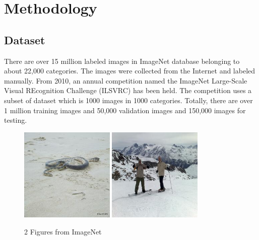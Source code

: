 
\chapter{Methodology} %
\label{Chapter3}

\section{Dataset}

There are over 15 million labeled images in ImageNet database belonging to about 22,000 categories. The images were collected from the Internet and labeled manually. From 2010, an annual competition named the ImageNet Large-Scale Visual REcognition Challenge (ILSVRC) has been held. The competition uses a subset of dataset which is 1000 images in 1000 categories. Totally, there are over 1 million training images and 50,000 validation images and 150,000 images for testing.
\graphicspath{ {./Figures/} }
\begin{figure}[!htb]
    \centering
	\includegraphics[width=0.4\textwidth]{ILSVRC2012_val_00000001.JPEG}
    \qquad
    \includegraphics[width=0.4\textwidth]{ILSVRC2012_val_00000002.JPEG}
    \caption{2 Figures from ImageNet}%
    \label{fig:ImageNetExamples}%
\end{figure}

